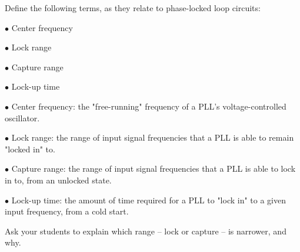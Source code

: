 

Define the following terms, as they relate to phase-locked loop circuits:

\medskip
\item{$\bullet$} Center frequency
\item{$\bullet$} Lock range 
\item{$\bullet$} Capture range
\item{$\bullet$} Lock-up time
\medskip







\medskip
\item{$\bullet$} Center frequency: the "free-running" frequency of a PLL's voltage-controlled oscillator.
\item{$\bullet$} Lock range: the range of input signal frequencies that a PLL is able to remain "locked in" to.
\item{$\bullet$} Capture range: the range of input signal frequencies that a PLL is able to lock in to, from an unlocked state.
\item{$\bullet$} Lock-up time: the amount of time required for a PLL to "lock in" to a given input frequency, from a cold start.
\medskip







Ask your students to explain which range -- lock or capture -- is narrower, and why.



